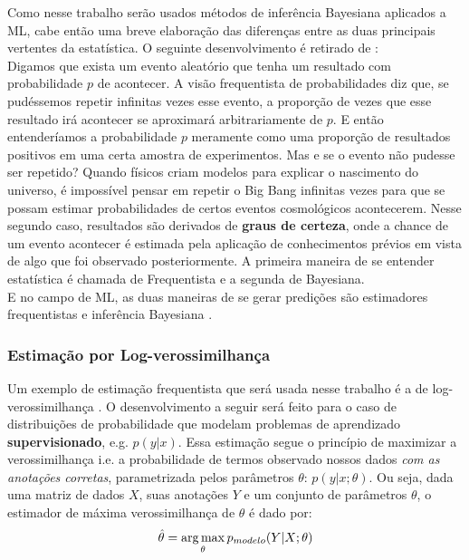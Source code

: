 Como nesse trabalho serão usados métodos de inferência Bayesiana aplicados a ML,
cabe então uma breve elaboração das diferenças entre as duas principais
vertentes da estatística. O seguinte desenvolvimento é retirado de \cite{dlbook}:\\

Digamos que exista um evento aleatório que tenha um resultado com probabilidade
$p$ de acontecer. A visão frequentista de probabilidades diz que, se pudéssemos repetir infinitas vezes esse evento, a proporção de vezes que esse resultado irá acontecer se aproximará arbitrariamente de $p$. E então entenderíamos a probabilidade $p$ meramente como uma proporção de resultados positivos em uma certa amostra de experimentos. Mas e se o evento não pudesse ser repetido? Quando físicos criam modelos para explicar o nascimento do universo, é impossível pensar em repetir o Big Bang infinitas vezes para que se possam estimar probabilidades de certos eventos cosmológicos acontecerem. Nesse segundo caso, resultados são derivados de \textbf{graus de certeza}, onde a chance de um evento acontecer é estimada pela aplicação de conhecimentos prévios em vista de algo que foi observado posteriormente. A primeira maneira de se entender estatística é chamada de Frequentista e a segunda de Bayesiana. \\

E no campo de ML, as duas maneiras de se gerar predições são estimadores frequentistas e inferência Bayesiana \citep{dlbook}.

\subsubsection{Estimação por Log-verossimilhança}
 
Um exemplo de estimação frequentista que será usada nesse trabalho é a de
log-verossimilhança \citep{dlbook}. O desenvolvimento a seguir será feito para o
caso de distribuições de probabilidade que modelam problemas de aprendizado
\textbf{supervisionado}, e.g. $p(y|x)$. 
Essa estimação segue o princípio de maximizar a verossimilhança i.e. a probabilidade de
termos observado nossos dados \textit{com as anotações corretas}, parametrizada pelos parâmetros $\theta$: $p(y|x ; \theta)$.
Ou seja, dada uma matriz de dados $X$, suas anotações $Y$ e um conjunto de parâmetros $\theta$, o estimador de máxima verossimilhança de $\theta$ é dado por: \\

\[ \hat{\theta} = \operatorname*{arg\,max}_{\theta} p_{modelo}(Y | X;\theta) \] 

